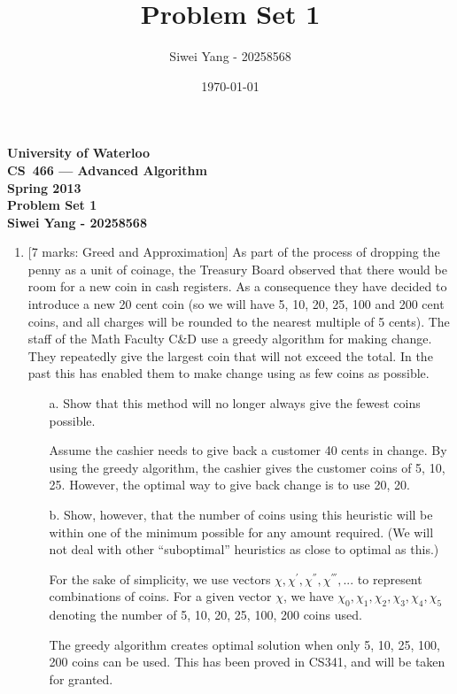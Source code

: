 \documentclass[12pt]{article}
\begin{document}
\begin{center}
\large\bf University of Waterloo\\
CS~466 --- Advanced Algorithm\\
Spring 2013\\
Problem Set 1\\
Siwei Yang - 20258568\\
\end{center}
\bigskip

\title{Problem Set 1}
\date{\today}
\author{Siwei Yang - 20258568}

\begin{enumerate}

\item{} [7 marks: Greed and Approximation]
As part of the process of dropping the penny as a unit of coinage, the Treasury Board observed that there would be room for a new coin in cash registers. As a consequence they have decided to introduce a new 20 cent coin (so we will have 5, 10, 20, 25, 100 and 200 cent coins, and all charges will be rounded to the nearest multiple of 5 cents). The staff of the Math Faculty C\&D use a greedy algorithm for making change. They repeatedly give the largest coin that will not exceed the total. In the past this has enabled them to make change using as few coins as possible.

\begin{itemize}

\item[a.] Show that this method will no longer always give the fewest coins possible.

Assume the cashier needs to give back a customer 40 cents in change. By using the greedy algorithm, the cashier gives the customer coins of 5, 10, 25. However, the optimal way to give back change is to use 20, 20.

\item[b.] Show, however, that the number of coins using this heuristic will be within one of the minimum possible for any amount required. (We will not deal with other “suboptimal” heuristics as close to optimal as this.)

For the sake of simplicity, we use vectors $\chi, \chi^{'}, \chi^{''}, \chi^{'''}, ...$ to represent combinations of coins. For a given vector $\chi$, we have $\chi_{0}, \chi_{1}, \chi_{2}, \chi_{3}, \chi_{4}, \chi_{5}$ denoting the number of 5, 10, 20, 25, 100, 200 coins used.

The greedy algorithm creates optimal solution when only 5, 10, 25, 100, 200 coins can be used. This has been proved in CS341, and will be taken for granted.


\end{itemize}
\end{enumerate}
\end{document}
